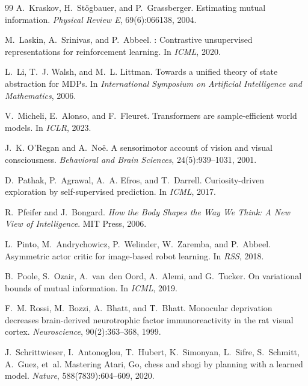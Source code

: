 \documentclass{article}
\begin{document}
\begin{thebibliography}{99}
A.~Kraskov, H.~St\"ogbauer, and P.~Grassberger.
\newblock Estimating mutual information.
\newblock \emph{Physical Review E}, 69(6):066138, 2004.

M.~Laskin, A.~Srinivas, and P.~Abbeel.
: Contrastive unsupervised representations for reinforcement
  learning.
\newblock In \emph{ICML}, 2020.

L.~Li, T.~J. Walsh, and M.~L. Littman.
\newblock Towards a unified theory of state abstraction for {MDPs}.
\newblock In \emph{International Symposium on Artificial Intelligence and
  Mathematics}, 2006.

V.~Micheli, E.~Alonso, and F.~Fleuret.
\newblock Transformers are sample-efficient world models.
\newblock In \emph{ICLR}, 2023.

J.~K. O'Regan and A.~No\"e.
\newblock A sensorimotor account of vision and visual consciousness.
\newblock \emph{Behavioral and Brain Sciences}, 24(5):939--1031, 2001.

D.~Pathak, P.~Agrawal, A.~A. Efros, and T.~Darrell.
\newblock Curiosity-driven exploration by self-supervised prediction.
\newblock In \emph{ICML}, 2017.

R.~Pfeifer and J.~Bongard.
\newblock \emph{How the Body Shapes the Way We Think: A New View of
  Intelligence}.
\newblock MIT Press, 2006.

L.~Pinto, M.~Andrychowicz, P.~Welinder, W.~Zaremba, and P.~Abbeel.
\newblock Asymmetric actor critic for image-based robot learning.
\newblock In \emph{RSS}, 2018.

B.~Poole, S.~Ozair, A.~van~den Oord, A.~Alemi, and G.~Tucker.
\newblock On variational bounds of mutual information.
\newblock In \emph{ICML}, 2019.

F.~M. Rossi, M.~Bozzi, A.~Bhatt, and T.~Bhatt.
\newblock Monocular deprivation decreases brain-derived neurotrophic factor
  immunoreactivity in the rat visual cortex.
\newblock \emph{Neuroscience}, 90(2):363--368, 1999.

J.~Schrittwieser, I.~Antonoglou, T.~Hubert, K.~Simonyan, L.~Sifre,
  S.~Schmitt, A.~Guez, et~al.
\newblock Mastering {Atari}, {Go}, chess and shogi by planning with a learned
  model.
\newblock \emph{Nature}, 588(7839):604--609, 2020.


\end{thebibliography}
\end{document}
